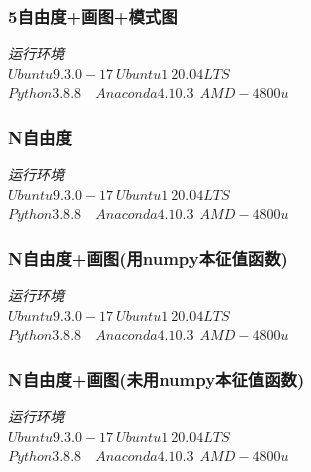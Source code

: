 \documentclass[11pt, a4paper, oneside]{ctexart}
\begin{document}
{{{\begin{appendices}
{\begin{flushright}
    \end{flushright}

    }
    \subsubsection{5自由度+画图+模式图}
    {    \begin{flushright}
        \scriptsize\emph{运行环境\\$Ubuntu 9.3.0-17\ Ubuntu1~20.04LTS$}\\
        \scriptsize\emph{$Python 3.8.8$\ \ $Anaconda 4.10.3\ \  AMD-4800u$}
            
        \end{flushright}
    
        }
        \subsubsection{N自由度}
    {    \begin{flushright}
        \scriptsize\emph{运行环境\\$Ubuntu 9.3.0-17\ Ubuntu1~20.04LTS$}\\
        \scriptsize\emph{$Python 3.8.8$\ \ $Anaconda 4.10.3\ \  AMD-4800u$}
            
        \end{flushright}
    
        }
        \subsubsection{N自由度+画图(用numpy本征值函数)}
        {    \begin{flushright}
            \scriptsize\emph{运行环境\\$Ubuntu 9.3.0-17\ Ubuntu1~20.04LTS$}\\
            \scriptsize\emph{$Python 3.8.8$\ \ $Anaconda 4.10.3\ \  AMD-4800u$}
                
            \end{flushright}
        
            }
            \subsubsection{N自由度+画图(未用numpy本征值函数)}
            {    \begin{flushright}
                \scriptsize\emph{运行环境\\$Ubuntu 9.3.0-17\ Ubuntu1~20.04LTS$}\\
                \scriptsize\emph{$Python 3.8.8$\ \ $Anaconda 4.10.3\ \  AMD-4800u$}
                    

\end{flushright}}
\end{appendices}}}}
\end{document}
